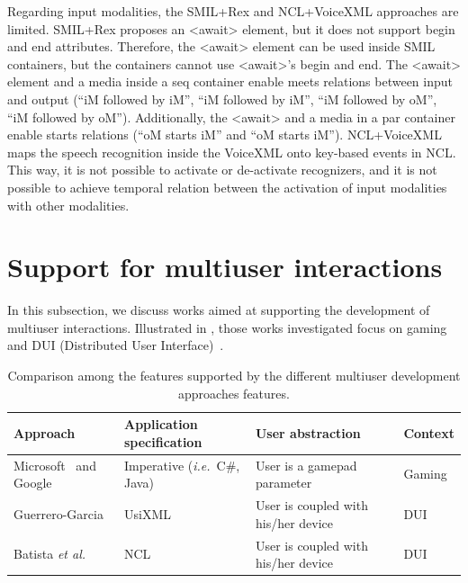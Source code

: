 Regarding input modalities, the SMIL+Rex and NCL+VoiceXML approaches are
limited. SMIL+Rex proposes an <await> element, but it does not support begin and
end attributes. Therefore, the <await> element can be used inside SMIL
containers, but the containers cannot use <await>’s begin and end. The <await>
element and a media inside a seq container enable meets relations between input
and output (“iM followed by iM”, “iM followed by iM”, “iM followed by oM”, “iM
followed by oM”). Additionally, the <await> and a media in a par container
enable starts relations (“oM starts iM” and “oM starts iM”). NCL+VoiceXML maps
the speech recognition inside the VoiceXML onto key-based events in NCL.
This way, it is not possible to activate or de-activate recognizers, and it is
not possible to achieve temporal relation between the activation of input
modalities with other modalities.

\section{Support for multiuser interactions}
\label{sec:state:multiuser}

In this subsection, we discuss works aimed at supporting the development of
multiuser interactions. Illustrated in , those works
investigated focus on gaming and DUI (Distributed User
Interface)~\cite{elmqvist_distributed_2011}.

\begin{table}[ht]
\scriptsize
\def\arraystretch{1.5}
\begin{tabular}{ m{3.5cm} m{3cm} m{4.5cm} m{1.3cm} }
	\hline
	\textbf{Approach} & \textbf{Application} \newline
	\textbf{specification} & \textbf{User} \newline
	\textbf{abstraction} & Context	\\
	\hline
	Microsoft~\cite{microsoft_getting_nodate} and \newline
	Google~\cite{google_supporting_nodate} &
	Imperative \newline (\textit{i.e.}~C\#, Java) &	User
	is a gamepad parameter & Gaming \\
	\hline
	Guerrero-Garcia~\cite{guerrero_garcia_designing_2010} &	UsiXML & User is
	coupled with his/her device & DUI \\
	\hline
	Batista \textit{et al.}~\cite{batista_estendendo_2010,batista_ginga-md:_2013}
	&	NCL & User is coupled with his/her device & DUI \\
	\hline
\end{tabular}
\caption{Comparison among the features supported by the different multiuser
development approaches features.}
\label{table:multiuser}
\end{table}

